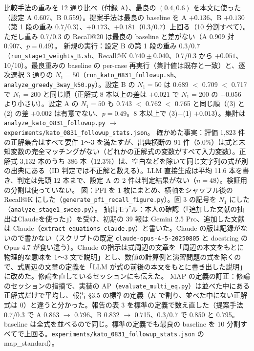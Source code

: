 \documentclass[11pt,a4paper]{jsarticle}
\begin{document}
\begin{itemize}[nosep]
    比較手法の重みを 12 通り比べ（付録 A）、最良の $(0.4, 0.6)$ を本文に使った（設定 A 0.607、B 0.559）。提案手法は最良の baseline を A $+0.136$、B $+0.130$（第 1 段の重み 0.7/0.3）、$+0.173$、$+0.181$（0.3/0.7）上回る（10 分割すべて）。ただし重み 0.7/0.3 の Recall@20 は最良の baseline と差がない（A 0.909 対 0.907、$p=0.49$）。
    新規の実行：設定 B の第 1 段の重み 0.3/0.7（\texttt{run\_stage1\_weights\_B.sh}、Recall@K $0.740 \pm 0.040$、0.7/0.3 から $+0.051$、10/10）。最良重みの baseline の per-case 再実行（集計値は既存と一致）と、逐次選択 3 通りの $N_1 = 50$（\texttt{run\_kato\_0831\_followup.sh}、\texttt{analyze\_greedy\_3way\_k50.py}）。設定 B の $N_1 = 50$ は 0.689 $<$ 0.709 $<$ 0.717 で $N_1 = 200$ と同じ順（正解式 8 本以上の差は $+0.021$ で $N_1 = 200$ の $+0.056$ より小さい）。設定 A の $N_1 = 50$ も 0.743 $<$ 0.762 $<$ 0.765 と同じ順（(3) と (2) の差 $+0.002$ は有意でない、$p = 0.49$。8 本以上で (3)$-$(1) $+0.013$）。集計は \texttt{analyze\_kato\_0831\_followup.py} $\to$ \texttt{experiments/kato\_0831\_followup\_stats.json}。
    確かめた事実：評価 1,823 件の正解集合はすべて要件 1〜3 を満たすが、出典横断の 91 件（5.0\%）は式と未知変数の完全マッチングがない（どれかの正解式の変数がすべて入力変数）。正解式 3,132 本のうち 386 本（12.3\%）は、空白などを除いて同じ文字列の式が別の出典にある（ID 判定では不正解と数える）。LLM 直接生成は平均 11.6 本を書き、判定は先頭 12 本まで、設定 A の 2 件は判定結果がない（$n=48$）。検証用の分割は使っていない。
    図：PFI を 1 枚にまとめ、横軸をシャッフル後の Recall@K にした（\texttt{generate\_pfi\_recall\_figure.py}）。図 3 の記号を $N_1$ にした（\texttt{analyze\_stage1\_sweep.py}）。
    抽出モデル：本人の確認（「追加した文献の抽出はClaudeを使った」）を受け、初期の 39 報は Gemini 2.5 Pro、追加した文献は Claude（\texttt{extract\_equations\_claude.py}）と書いた。Claude の版は記録がないので書かない（スクリプトの既定 \texttt{claude-opus-4-5-20250805} と docstring の Opus 4.7 が食い違う）。Claude の指示は式周辺の文章を「周辺の本文をもとに物理的な意味を 1〜3 文で説明」とし、数値の計算例と演習問題の式を除くので、式周辺の文章の定義を「LLM が式の前後の本文をもとに書き出した説明」に改めた。修論を直しているセッションにも伝えた。
    MAP の定義の訂正：修論のセッションの指摘で、実装の AP（\texttt{evaluate\_multi\_eq.py}）は並べた中にある正解式だけで平均し、報告 \S 3.5 の標準の定義（$K$ で割り、並べた中にない正解式は 0）と違うと分かった。報告の表 3 を標準の定義で数え直した（提案手法 0.7/0.3 で A 0.863 $\to$ 0.796、B 0.832 $\to$ 0.715、0.3/0.7 で 0.850 と 0.795。baseline は全式を並べるので同じ。標準の定義でも最良の baseline を 10 分割すべてで上回る。\texttt{experiments/kato\_0831\_followup\_stats.json} の map\_standard）。

\end{itemize}
\end{document}
